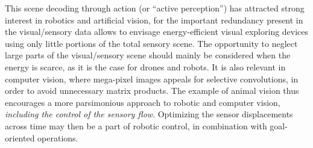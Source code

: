 \documentclass[12pt,twoside,openright]{article}
\begin{document}
This scene decoding through action (or ``active perception'') has attracted strong interest in robotics and artificial vision,
 for the important redundancy present in the {\color{blue} visual/sensory} data allows to envisage energy-efficient visual exploring devices  
using only little portions of the total sensory scene.
The opportunity to neglect large parts of the {\color{blue} visual/sensory} scene should mainly be considered when the energy is scarce, as it is the case for drones and robots. 
It is also relevant in computer vision, where mega-pixel images appeals for selective convolutions, in order to avoid unnecessary matrix products. 
The example of animal vision thus encourages a more parsimonious approach to robotic and computer vision, \emph{including the control of the sensory flow}. 
Optimizing the sensor displacements across time may then be a part of robotic control, in combination with goal-oriented operations. 


%


\end{document}
